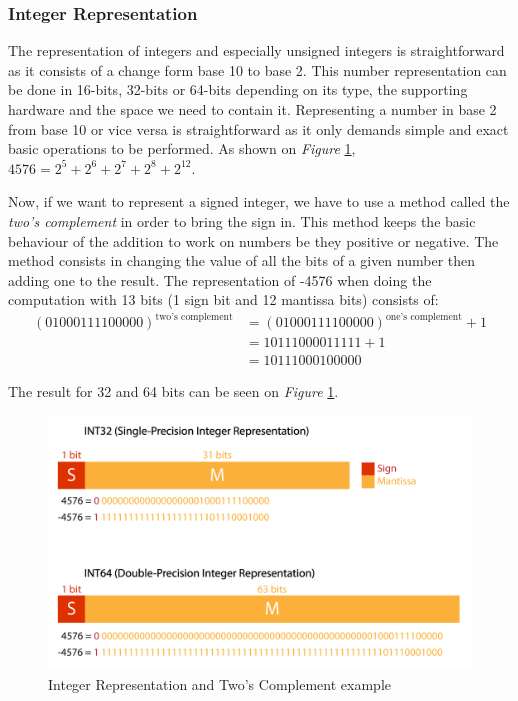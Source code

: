 \subsubsection{Integer Representation}

The representation of integers and especially unsigned integers is straightforward as it consists of a change form base 10 to base 2. This number representation can be done in 16-bits, 32-bits or 64-bits depending on its type, the supporting hardware and the space we need to contain it. Representing a number in base 2 from base 10 or vice versa is straightforward as it only demands simple and exact basic operations to be performed. As shown on \emph{Figure} \ref{fig:IntegerRepr}, $4576 = 2^5 + 2^6 + 2^7 + 2^8 + 2^{12}$.

Now, if we want to represent a signed integer, we have to use a method called the \emph{two's complement} in order to bring the sign in. This method keeps the basic behaviour of the addition to work on numbers be they positive or negative. The method consists in changing the value of all the bits of a given number then adding one to the result. The representation of -4576 when doing the computation with 13 bits (1 sign bit and 12 mantissa bits) consists of:
\begin{align}
(01000111100000)^\text{two's complement} &= (01000111100000)^\text{one's complement} + 1\\ \nonumber
                                         &= 10111000011111 + 1\\ \nonumber
                                         &= 10111000100000
\end{align}

The result for 32 and 64 bits can be seen on \emph{Figure} \ref{fig:IntegerRepr}.

\begin{figure}[htbp]
	\centering
		\includegraphics[width=.8\textwidth]{Figures/IntegerRepr.png}
	\caption[Integer Representation]{Integer Representation and Two's Complement example}
	\label{fig:IntegerRepr}
\end{figure}

